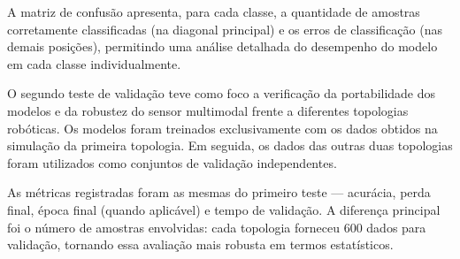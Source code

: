 A matriz de confusão apresenta, para cada classe, a quantidade de amostras corretamente classificadas (na diagonal principal) e os erros de classificação (nas demais posições), permitindo uma análise detalhada do desempenho do modelo em cada classe individualmente.

O segundo teste de validação teve como foco a verificação da portabilidade dos modelos e da robustez do sensor multimodal frente a diferentes topologias robóticas. Os modelos foram treinados exclusivamente com os dados obtidos na simulação da primeira topologia. Em seguida, os dados das outras duas topologias foram utilizados como conjuntos de validação independentes.

As métricas registradas foram as mesmas do primeiro teste — acurácia, perda final, época final (quando aplicável) e tempo de validação. A diferença principal foi o número de amostras envolvidas: cada topologia forneceu 600 dados para validação, tornando essa avaliação mais robusta em termos estatísticos.


